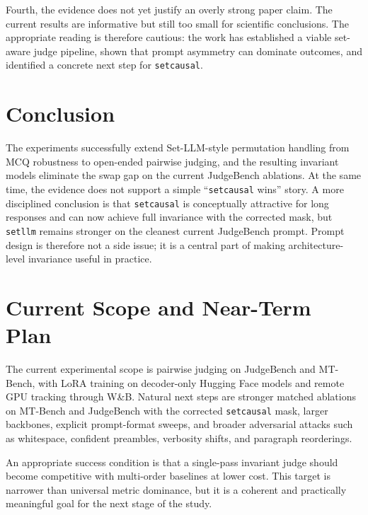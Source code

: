 \documentclass{article}
\begin{document}
Fourth, the evidence does not yet justify an overly strong paper claim. The current results are informative but still too small for scientific conclusions. The appropriate reading is therefore cautious: the work has established a viable set-aware judge pipeline, shown that prompt asymmetry can dominate outcomes, and identified a concrete next step for \texttt{setcausal}.

\section{Conclusion}

The experiments successfully extend Set-LLM-style permutation handling from MCQ robustness to open-ended pairwise judging, and the resulting invariant models eliminate the swap gap on the current JudgeBench ablations. At the same time, the evidence does not support a simple ``\texttt{setcausal} wins'' story. A more disciplined conclusion is that \texttt{setcausal} is conceptually attractive for long responses and can now achieve full invariance with the corrected mask, but \texttt{setllm} remains stronger on the cleanest current JudgeBench prompt. Prompt design is therefore not a side issue; it is a central part of making architecture-level invariance useful in practice.

\newpage
\appendix

\section{Current Scope and Near-Term Plan}

The current experimental scope is pairwise judging on JudgeBench and MT-Bench, with LoRA training on decoder-only Hugging Face models and remote GPU tracking through W\&B. Natural next steps are stronger matched ablations on MT-Bench and JudgeBench with the corrected \texttt{setcausal} mask, larger backbones, explicit prompt-format sweeps, and broader adversarial attacks such as whitespace, confident preambles, verbosity shifts, and paragraph reorderings.

An appropriate success condition is that a single-pass invariant judge should become competitive with multi-order baselines at lower cost. This target is narrower than universal metric dominance, but it is a coherent and practically meaningful goal for the next stage of the study.
\end{document}
